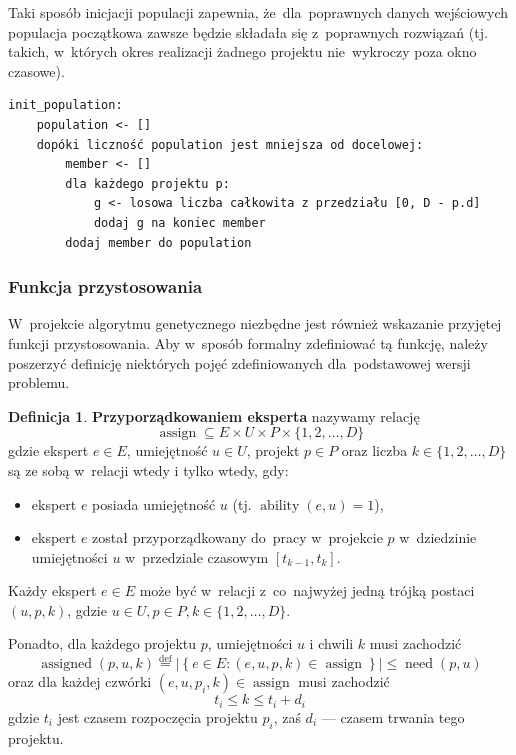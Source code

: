 \documentclass[12pt,a4paper]{article}
\theoremstyle{definition}
\newtheorem{defn}{Definicja}
\DeclareMathOperator{\ability}{ability}
\DeclareMathOperator{\need}{need}
\DeclareMathOperator{\assign}{assign}
\DeclareMathOperator{\assigned}{assigned}
\begin{document}
\noindent
Taki sposób inicjacji populacji zapewnia, że~dla~poprawnych danych wejściowych populacja początkowa zawsze będzie składała się z~poprawnych rozwiązań (tj. takich, w~których okres realizacji żadnego projektu nie~wykroczy poza okno
czasowe).\\

\begin{tcolorbox}[title=Losowanie populacji początkowej]
\begin{verbatim}
init_population:
    population <- []
    dopóki liczność population jest mniejsza od docelowej:
        member <- []
        dla każdego projektu p:
            g <- losowa liczba całkowita z przedziału [0, D - p.d]
            dodaj g na koniec member
        dodaj member do population
\end{verbatim}
\end{tcolorbox} 

\subsubsection{Funkcja przystosowania}
W~projekcie algorytmu genetycznego niezbędne jest również wskazanie przyjętej funkcji przystosowania.
Aby w~sposób formalny zdefiniować tą funkcję, należy poszerzyć definicję niektórych pojęć zdefiniowanych dla~podstawowej wersji problemu.

\begin{defn}
\textbf{Przyporządkowaniem eksperta} nazywamy relację
$$ \assign \subseteq E \times U \times P \times \{ 1, 2, \dots, D \} $$
gdzie ekspert $e \in E$, umiejętność $u \in U$, projekt $p \in P$ oraz liczba $k \in \{1, 2, \dots, D\}$ są ze sobą w~relacji wtedy i tylko wtedy, gdy:
\begin{itemize}
	\item ekspert $e$ posiada umiejętność $u$ (tj. $\ability(e, u) = 1$),
	\item ekspert $e$ został przyporządkowany do~pracy w~projekcie $p$ w~dziedzinie umiejętności $u$ w~przedziale czasowym $[t_{k-1}, t_k]$.
\end{itemize}
Każdy ekspert $e \in E$ może być w~relacji z~co~najwyżej jedną trójką postaci
$(u,p,k)$, gdzie $u \in U, p \in P, k \in \{1, 2, \dots, D\}$.

\noindent
Ponadto, dla każdego projektu $p$, umiejętności $u$ i chwili $k$ musi zachodzić
$$\assigned(p,u,k) \overset{\text{def}}{=} \left| \left\lbrace e \in E : (e,u,p,k)
\in \assign \right\rbrace \right| \leq \need(p,u)$$
oraz dla każdej czwórki $(e, u, p_i, k) \in \assign$ musi zachodzić
$$ t_i \leq k \leq t_i + d_i $$
gdzie $t_i$ jest czasem rozpoczęcia projektu $p_i$, zaś $d_i$ --- czasem trwania tego projektu.
\end{defn}
\end{document}

